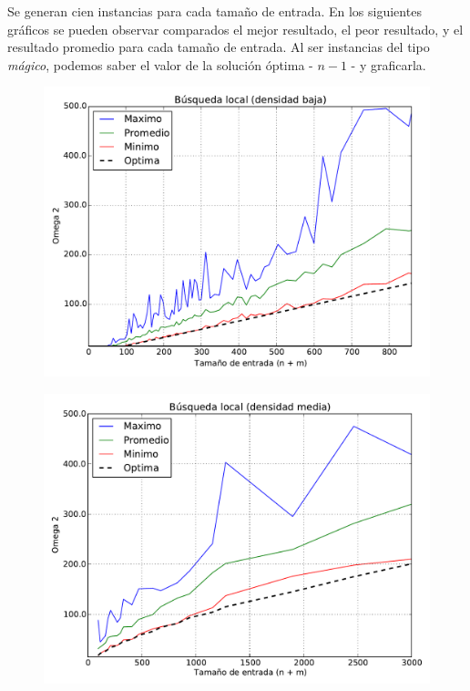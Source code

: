Se generan cien instancias para cada tamaño de entrada. En los siguientes gráficos se pueden observar comparados el mejor resultado, el peor
resultado, y el resultado promedio para cada tamaño de entrada. Al ser instancias del tipo \textit{mágico}, podemos saber el valor de la solución óptima - $n-1$ - y graficarla.

\begin{figure}[H]
\begin{center}
\includegraphics[angle=0, scale=.70]{imagenes/calidad_local_search_2014-06-27_16-02-57.pdf}
\label{grafico local}
\end{center}
\end{figure}

\begin{figure}[H]
\begin{center}
\includegraphics[angle=0, scale=.70]{imagenes/calidad_local_search_2014-06-27_08-58-52.pdf}
\label{grafico local}
\end{center}
\end{figure}


